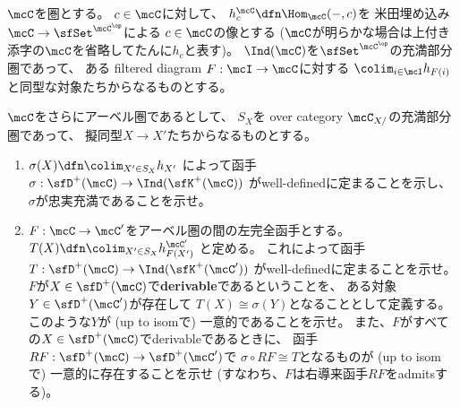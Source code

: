 \documentclass[uplatex,dvipdfmx]{jsarticle}
\begin{document}
\maketitle
\HeaderCommentA
\section{}
\fi



\begin{prob}\label{1.15}
  \(\mcC\)を圏とする。
  \(c\in \mcC\)に対して、
  \(h_c^{\mcC} \dfn \Hom_{\mcC}(-,c)\)を
  米田埋め込み\(\mcC\to \sfSet^{\mcC^{\op}}\)による
  \(c\in \mcC\)の像とする
  (\(\mcC\)が明らかな場合は上付き添字の\(\mcC\)を省略してたんに\(h_c\)と表す)。
  \(\Ind(\mcC)\)を\(\sfSet^{\mcC^{\op}}\)の充満部分圏であって、
  ある filtered diagram \(F:\mcI\to \mcC\)に対する
  \(\colim_{i\in \mcI} h_{F(i)}\)と同型な対象たちからなるものとする。

  \(\mcC\)をさらにアーベル圏であるとして、
  \(S_X\)を over category \(\mcC_{X/}\)の充満部分圏であって、
  擬同型\(X\to X'\)たちからなるものとする。
  \begin{enumerate}
    \item \label{1.15.1}
    \(\sigma(X) \dfn \colim_{X'\in S_X}h_{X'}\)
    によって函手
    \(\sigma:\sfD^+(\mcC)\to \Ind(\sfK^+(\mcC))\)
    がwell-definedに定まることを示し、
    \(\sigma\)が忠実充満であることを示せ。
    \item \label{1.15.2}
    \(F:\mcC\to \mcC'\)をアーベル圏の間の左完全函手とする。
    \(T(X)\dfn \colim_{X'\in S_X}h_{F(X')}^{\mcC'}\)
    と定める。
    これによって函手\(T:\sfD^+(\mcC)\to \Ind(\sfK^+(\mcC'))\)
    がwell-definedに定まることを示せ。
    \(F\)が\(X\in \sfD^+(\mcC)\)で\textbf{derivable}であるということを、
    ある対象\(Y\in \sfD^+(\mcC')\)が存在して
    \(T(X) \cong \sigma(Y)\)となることとして定義する。
    このような\(Y\)が (up to isomで) 一意的であることを示せ。
    また、\(F\)がすべての\(X\in \sfD^+(\mcC)\)でderivableであるときに、
    函手\(RF:\sfD^+(\mcC)\to \sfD^+(\mcC')\)で
    \(\sigma\circ RF \cong T\)となるものが (up to isomで) 一意的に存在することを示せ
    (すなわち、\(F\)は右導来函手\(RF\)をadmitsする)。
  \end{enumerate}
\end{prob}
\end{document}
